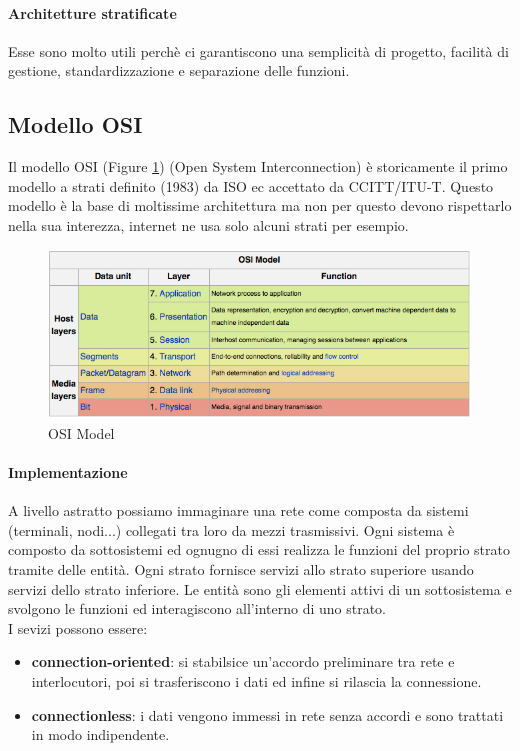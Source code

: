 \documentclass[12pt]{article}
\begin{document}
\paragraph{Architetture stratificate}
Esse sono molto utili perchè ci garantiscono una semplicità di progetto, facilità di gestione, standardizzazione e separazione delle funzioni.

\subsection{Modello OSI}
Il modello OSI (Figure \ref{fig:osimodel}) (Open System Interconnection) è storicamente il primo modello a strati definito (1983) da ISO ec accettato da CCITT/ITU-T. Questo modello è la base di moltissime architettura ma non per questo devono rispettarlo nella sua interezza, internet ne usa solo alcuni strati per esempio.
\begin{figure}[!h]
  \centering
  \includegraphics[width=\linewidth]{images/osimodel.jpg}
  \caption{OSI Model}
  \label{fig:osimodel}
\end{figure}
\paragraph{Implementazione}
A livello astratto possiamo immaginare una rete come composta da sistemi (terminali, nodi...) collegati tra loro da mezzi trasmissivi. Ogni sistema è composto da sottosistemi ed ognugno di essi realizza le funzioni del proprio strato tramite delle entità. Ogni strato fornisce servizi allo strato superiore usando servizi dello strato inferiore. Le entità sono gli elementi attivi di un sottosistema e svolgono le funzioni ed interagiscono all'interno di uno strato.\\
I sevizi possono essere:
\begin{itemize}
  \item \textbf{connection-oriented}: si stabilsice un'accordo preliminare tra rete e interlocutori, poi si trasferiscono i dati ed infine si rilascia la connessione.
  \item \textbf{connectionless}: i dati vengono immessi in rete senza accordi e sono trattati in modo indipendente.
\end{itemize}
\end{document}
